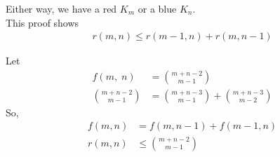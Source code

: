 \documentclass[12pt]{article}
\begin{document}
Either way, we have a red $K_m$ or a blue $K_n$.\\

This proof shows
\begin{align*}
    r(m,n) \le r(m-1,n)+r(m,n-1) \tag{m,n$\ge$ 3} 
\end{align*}

Let 
\begin{align*}
    f(m,\;n) &= \binom{m+n-2}{m-1} \tag{m,n$\ge$2}\\
    \binom{m+n-2}{m-1}&=\binom{m+n-3}{m-1}+\binom{m+n-3}{m-2} \tag{Pascal's Formula}
\end{align*}
So,
\begin{align*}
    f(m,n)&=f(m,n-1)+f(m-1,n)\\
    r(m,n)&\le\binom{m+n-2}{m-1}
\end{align*}
\end{document}
